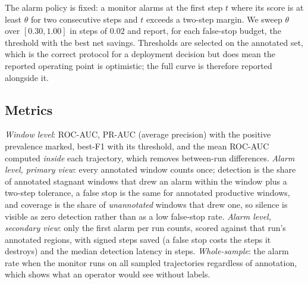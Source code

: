 The alarm policy is fixed: a monitor alarms at the first step $t$ where its score is at least $\theta$
for two consecutive steps and $t$ exceeds a two-step margin. We sweep $\theta$ over $[0.30,1.00]$ in
steps of $0.02$ and report, for each false-stop budget, the threshold with the best net savings.
Thresholds are selected on the annotated set, which is the correct protocol for a deployment decision but
does mean the reported operating point is optimistic; the full curve is therefore reported alongside it.

\subsection{Metrics}
\emph{Window level}: ROC-AUC, PR-AUC (average precision) with the positive prevalence marked, best-F1 with
its threshold, and the mean ROC-AUC computed \emph{inside} each trajectory, which removes between-run
differences. \emph{Alarm level, primary view}: every annotated window counts once; detection is the share
of annotated stagnant windows that drew an alarm within the window plus a two-step tolerance, a false stop
is the same for annotated productive windows, and coverage is the share of \emph{unannotated} windows that
drew one, so silence is visible as zero detection rather than as a low false-stop rate. \emph{Alarm level,
secondary view}: only the first alarm per run counts, scored against that run's annotated regions, with
signed steps saved (a false stop costs the steps it destroys) and the median detection latency in steps.
\emph{Whole-sample}: the alarm rate when the monitor runs on all \pnTraj{} sampled trajectories regardless
of annotation, which shows what an operator would see without labels.
